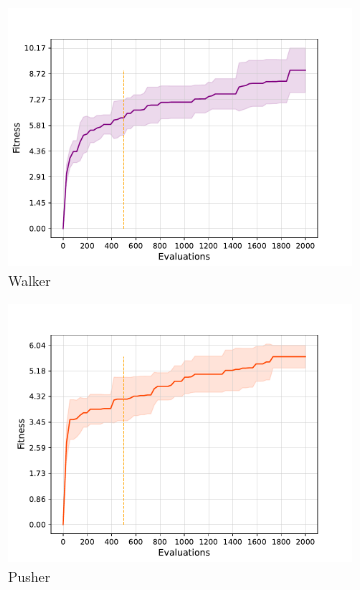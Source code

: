 \begin{figure}
    \centering
    \begin{subfigure}[b]{0.3\textwidth}
        \centering
        \includegraphics[scale=0.35]{images/multitasking/ft_walker.pdf}
        \caption{Walker}
    \end{subfigure}
    \begin{subfigure}[b]{0.3\textwidth}
        \centering
        \includegraphics[scale=0.35]{images/multitasking/ft_pusher.pdf}
        \caption{Pusher}
    \end{subfigure}
    \begin{subfigure}[b]{0.3\textwidth}
        \centering

\end{subfigure}
\end{figure}
